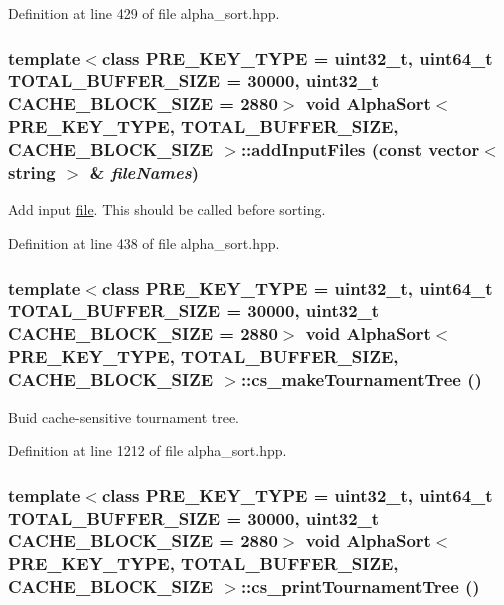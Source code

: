 Definition at line 429 of file alpha\_\-sort.hpp.\hypertarget{classAlphaSort_25c8706bb2e9b9300551baa96d3114b0}{
\subsubsection[{addInputFiles}]{\setlength{\rightskip}{0pt plus 5cm}template$<$class PRE\_\-KEY\_\-TYPE  = uint32\_\-t, uint64\_\-t TOTAL\_\-BUFFER\_\-SIZE = 30000, uint32\_\-t CACHE\_\-BLOCK\_\-SIZE = 2880$>$ void {\bf AlphaSort}$<$ PRE\_\-KEY\_\-TYPE, TOTAL\_\-BUFFER\_\-SIZE, CACHE\_\-BLOCK\_\-SIZE $>$::addInputFiles (const vector$<$ string $>$ \& {\em fileNames})}}
\label{classAlphaSort_25c8706bb2e9b9300551baa96d3114b0}


Add input \hyperlink{classfile}{file}. This should be called before sorting. 

Definition at line 438 of file alpha\_\-sort.hpp.\hypertarget{classAlphaSort_351cac12b318cbb06bf142a170f384ef}{
\subsubsection[{cs\_\-makeTournamentTree}]{\setlength{\rightskip}{0pt plus 5cm}template$<$class PRE\_\-KEY\_\-TYPE  = uint32\_\-t, uint64\_\-t TOTAL\_\-BUFFER\_\-SIZE = 30000, uint32\_\-t CACHE\_\-BLOCK\_\-SIZE = 2880$>$ void {\bf AlphaSort}$<$ PRE\_\-KEY\_\-TYPE, TOTAL\_\-BUFFER\_\-SIZE, CACHE\_\-BLOCK\_\-SIZE $>$::cs\_\-makeTournamentTree ()}}
\label{classAlphaSort_351cac12b318cbb06bf142a170f384ef}


Buid cache-sensitive tournament tree. 

Definition at line 1212 of file alpha\_\-sort.hpp.\hypertarget{classAlphaSort_5b973444db69202f66a633a5cfdf16e6}{
\subsubsection[{cs\_\-printTournamentTree}]{\setlength{\rightskip}{0pt plus 5cm}template$<$class PRE\_\-KEY\_\-TYPE  = uint32\_\-t, uint64\_\-t TOTAL\_\-BUFFER\_\-SIZE = 30000, uint32\_\-t CACHE\_\-BLOCK\_\-SIZE = 2880$>$ void {\bf AlphaSort}$<$ PRE\_\-KEY\_\-TYPE, TOTAL\_\-BUFFER\_\-SIZE, CACHE\_\-BLOCK\_\-SIZE $>$::cs\_\-printTournamentTree ()}}
\label{classAlphaSort_5b973444db69202f66a633a5cfdf16e6}


